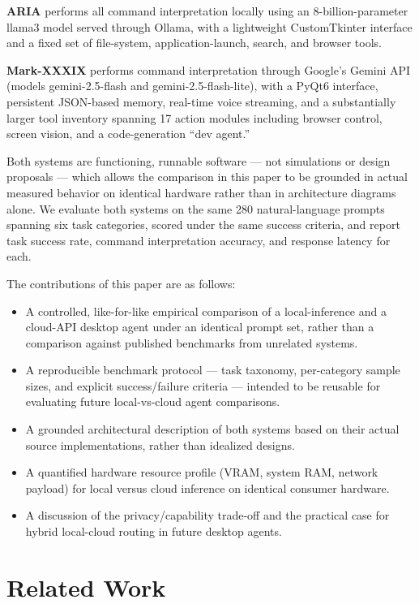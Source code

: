 \documentclass[conference]{IEEEtran}
\begin{document}
\textbf{ARIA} performs all command interpretation locally using an 8-billion-parameter llama3 model served through Ollama, with a lightweight CustomTkinter interface and a fixed set of file-system, application-launch, search, and browser tools.

\textbf{Mark-XXXIX} performs command interpretation through Google's Gemini API (models gemini-2.5-flash and gemini-2.5-flash-lite), with a PyQt6 interface, persistent JSON-based memory, real-time voice streaming, and a substantially larger tool inventory spanning 17 action modules including browser control, screen vision, and a code-generation ``dev agent.''

Both systems are functioning, runnable software --- not simulations or design proposals --- which allows the comparison in this paper to be grounded in actual measured behavior on identical hardware rather than in architecture diagrams alone. We evaluate both systems on the same 280 natural-language prompts spanning six task categories, scored under the same success criteria, and report task success rate, command interpretation accuracy, and response latency for each.

The contributions of this paper are as follows:
\begin{itemize}
\item A controlled, like-for-like empirical comparison of a local-inference and a cloud-API desktop agent under an identical prompt set, rather than a comparison against published benchmarks from unrelated systems.
\item A reproducible benchmark protocol --- task taxonomy, per-category sample sizes, and explicit success/failure criteria --- intended to be reusable for evaluating future local-vs-cloud agent comparisons.
\item A grounded architectural description of both systems based on their actual source implementations, rather than idealized designs.
\item A quantified hardware resource profile (VRAM, system RAM, network payload) for local versus cloud inference on identical consumer hardware.
\item A discussion of the privacy/capability trade-off and the practical case for hybrid local-cloud routing in future desktop agents.
\end{itemize}

\section{Related Work}
\end{document}
